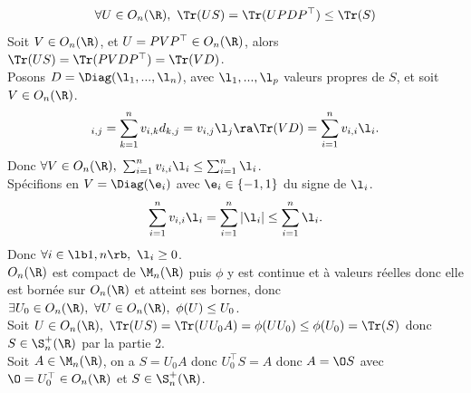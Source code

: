 \documentclass[11pt]{article}
\begin{document}
\begin{exercice}{}{}
    \begin{equation*}
        \forall U \in O_n(\R), ~ \Tr(US) = \Tr(UPDP^\top) \leq \Tr(S)
    \end{equation*}
    Soit $V\in O_n(\R)$, et $U=PVP^\top\in O_n(\R)$, alors $\Tr(US)=\Tr(PVDP^\top)=\Tr(VD)$.\\
    Posons $D=\Diag(\l_1,...,\l_n)$, avec $\l_1,...,\l_p$ valeurs propres de $S$, et soit $V\in O_n(\R)$.
    \begin{equation*}
        [VD]_{i,j} = \sum_{k=1}^n v_{i,k}d_{k,j} = v_{i,j}\l_j \ra \Tr(VD) = \sum_{i=1}^n v_{i,i}\l_i.
    \end{equation*}
    Donc $\forall V \in O_n(\R), ~ \sum_{i=1}^nv_{i,i}\l_i \leq \sum_{i=1}^n \l_i$.\\
    Spécifions en $V=\Diag(\e_i)$ avec $\e_i \in \{-1,1\}$ du signe de $\l_i$.
    \begin{equation*}
        \sum_{i=1}^n v_{i,i}\l_i = \sum_{i=1}^n |\l_i| \leq \sum_{i=1}^n\l_i.
    \end{equation*}
    Donc $\forall i \in \lb1,n\rb, ~ \l_i \geq 0$.\\
     $O_n(\R)$ est compact de $\M_n(\R)$ puis $\phi$ y est continue et à valeurs réelles donc elle est bornée sur $O_n(\R)$ et atteint ses bornes, donc $\exists U_0 \in O_n(\R), ~ \forall U \in O_n(\R), ~ \phi(U) \leq U_0$.\\
     Soit $U\in O_n(\R), ~ \Tr(US)=\Tr(UU_0A) = \phi(UU_0) \leq \phi(U_0) = \Tr(S)$ donc $S\in\S_n^+(\R)$ par la partie 2.\\
     Soit $A\in\M_n(\R)$, on a $S=U_0A$ donc $U_0^\top S = A$ donc $A=\O S$ avec $\O = U_0^\top \in O_n(\R)$ et $S\in\S_n^+(\R)$.
\end{exercice}
\end{document}
